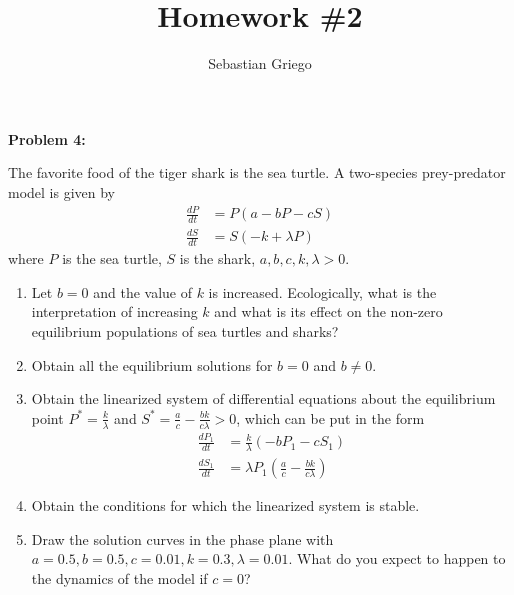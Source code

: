 \documentclass[12pt]{article}
\newenvironment{problem}[1]{
    \textbf{Problem #1:}
}{
    \rmfamily \vspace{1em}
}
\begin{document}
\title{Homework \#2}  %
\author{Sebastian Griego}  %

\begin{problem}{4}
    The favorite food of the tiger shark is the sea turtle. A two-species prey-predator model is given by
    \[
        \begin{aligned}
            \frac{dP}{dt} &= P(a - bP - cS)\\
            \frac{dS}{dt} &= S(-k + \lambda P)
        \end{aligned}
    \]
    where \(P\) is the sea turtle, \(S\) is the shark, \(a, b, c, k, \lambda > 0\).
    \begin{enumerate}
        \item Let \(b = 0\) and the value of \(k\) is increased. Ecologically, what is the interpretation of increasing \(k\) and what is its effect on the non-zero equilibrium populations of sea turtles and sharks?
        \item Obtain all the equilibrium solutions for \(b = 0\) and \(b \neq 0\).
        \item Obtain the linearized system of differential equations about the equilibrium point \(P^* = \frac{k}{\lambda}\) and \(S^* = \frac{a}{c} - \frac{bk}{c\lambda} > 0\), which can be put in the form
        \[
            \begin{aligned}
                \frac{dP_1}{dt} &= \frac{k}{\lambda} (-bP_1 - cS_1)\\
                \frac{dS_1}{dt} &= \lambda P_1 \left(\frac{a}{c} - \frac{bk}{c\lambda}\right)
            \end{aligned}
        \]
        \item Obtain the conditions for which the linearized system is stable.
        \item Draw the solution curves in the phase plane with \(a = 0.5, b = 0.5, c = 0.01, k = 0.3, \lambda = 0.01\). What do you expect to happen to the dynamics of the model if \(c=0\)?
    \end{enumerate}
\end{problem}
\end{document}
